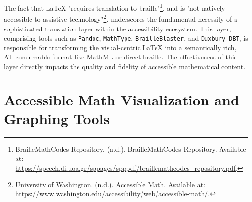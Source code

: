 The fact that LaTeX "requires translation to braille"\footnote{BrailleMathCodes Repository. (n.d.). BrailleMathCodes Repository. Available at: \url{https://speech.di.uoa.gr/sppages/spppdf/braillemathcodes_repository.pdf}.}. and is "not natively accessible to assistive technology"\footnote{University of Washington. (n.d.). Accessible Math. Available at: \url{https://www.washington.edu/accessibility/web/accessible-math/}.}. underscores the fundamental necessity of a sophisticated translation layer within the accessibility ecosystem. This layer, comprising tools such as \texttt{Pandoc}, \texttt{MathType}, \texttt{BrailleBlaster}, and \texttt{Duxbury DBT}, is responsible for transforming the visual-centric LaTeX into a semantically rich, AT-consumable format like MathML or direct braille. The effectiveness of this layer directly impacts the quality and fidelity of accessible mathematical content.

\section{Accessible Math Visualization and Graphing Tools}
